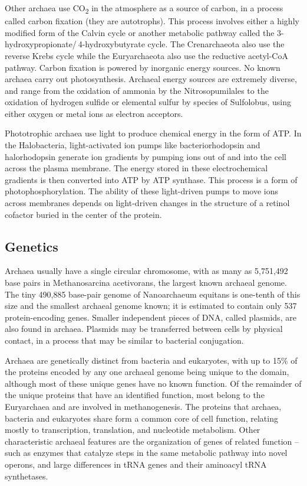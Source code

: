 Other archaea use CO\textsubscript{2} in the atmosphere as a source of carbon, in a process called carbon fixation (they are autotrophs). This process involves either a highly modified form of the Calvin cycle or another metabolic pathway called the 3-hydroxypropionate/ 4-hydroxybutyrate cycle. The Crenarchaeota also use the reverse Krebs cycle while the Euryarchaeota also use the reductive acetyl-CoA pathway. Carbon fixation is powered by inorganic energy sources. No known archaea carry out photosynthesis. Archaeal energy sources are extremely diverse, and range from the oxidation of ammonia by the Nitrosopumilales to the oxidation of hydrogen sulfide or elemental sulfur by species of Sulfolobus, using either oxygen or metal ions as electron acceptors.

Phototrophic archaea use light to produce chemical energy in the form of ATP. In the Halobacteria, light-activated ion pumps like bacteriorhodopsin and halorhodopsin generate ion gradients by pumping ions out of and into the cell across the plasma membrane. The energy stored in these electrochemical gradients is then converted into ATP by ATP synthase. This process is a form of photophosphorylation. The ability of these light-driven pumps to move ions across membranes depends on light-driven changes in the structure of a retinol cofactor buried in the center of the protein.

\hypertarget{genetics-2}{%
\subsection{Genetics}\label{genetics-2}}

Archaea usually have a single circular chromosome, with as many as 5,751,492 base pairs in Methanosarcina acetivorans, the largest known archaeal genome. The tiny 490,885 base-pair genome of Nanoarchaeum equitans is one-tenth of this size and the smallest archaeal genome known; it is estimated to contain only 537 protein-encoding genes. Smaller independent pieces of DNA, called plasmids, are also found in archaea. Plasmids may be transferred between cells by physical contact, in a process that may be similar to bacterial conjugation.

Archaea are genetically distinct from bacteria and eukaryotes, with up to 15\% of the proteins encoded by any one archaeal genome being unique to the domain, although most of these unique genes have no known function. Of the remainder of the unique proteins that have an identified function, most belong to the Euryarchaea and are involved in methanogenesis. The proteins that archaea, bacteria and eukaryotes share form a common core of cell function, relating mostly to transcription, translation, and nucleotide metabolism. Other characteristic archaeal features are the organization of genes of related function -- such as enzymes that catalyze steps in the same metabolic pathway into novel operons, and large differences in tRNA genes and their aminoacyl tRNA synthetases.


